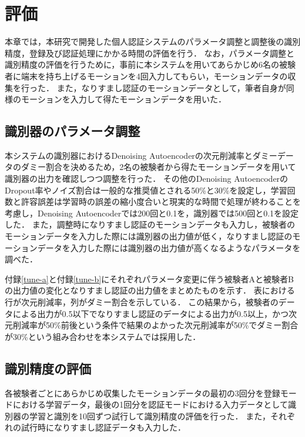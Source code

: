 \chapter{評価}
本章では，本研究で開発した個人認証システムのパラメータ調整と調整後の識別精度，登録及び認証処理にかかる時間の評価を行う．
なお，パラメータ調整と識別精度の評価を行うために，事前に本システムを用いてあらかじめ6名の被験者に端末を持ち上げるモーションを4回入力してもらい，モーションデータの収集を行った．
また，なりすまし認証のモーションデータとして，筆者自身が同様のモーションを入力して得たモーションデータを用いた．

\section{識別器のパラメータ調整}
本システムの識別器におけるDenoising Autoencoderの次元削減率とダミーデータのダミー割合を決めるため，2名の被験者から得たモーションデータを用いて識別器の出力を確認しつつ調整を行った．
その他のDenoising AutoencoderのDropout率やノイズ割合は一般的な推奨値とされる50\%と30\%を設定し，学習回数と許容誤差は学習時の誤差の縮小度合いと現実的な時間で処理が終わることを考慮し，Denoising Autoencoderでは200回と0.1を，識別器では500回と0.1を設定した．
また，調整時になりすまし認証のモーションデータも入力し，被験者のモーションデータを入力した際には識別器の出力値が低く，なりすまし認証のモーションデータを入力した際には識別器の出力値が高くなるようなパラメータを調べた．

付録\ref{tune-a}と付録\ref{tune-b}にそれぞれパラメータ変更に伴う被験者Aと被験者Bの出力値の変化となりすまし認証の出力値をまとめたものを示す．
表における行が次元削減率，列がダミー割合を示している．
この結果から，被験者のデータによる出力が0.5以下でなりすまし認証のデータによる出力が0.5以上，かつ次元削減率が50\%前後という条件で結果のよかった次元削減率が50\%でダミー割合が30\%という組み合わせを本システムでは採用した．


\section{識別精度の評価}
各被験者ごとにあらかじめ収集したモーションデータの最初の3回分を登録モードにおける学習データ，最後の1回分を認証モードにおける入力データとして識別器の学習と識別を10回ずつ試行して識別精度の評価を行った．
また，それぞれの試行時になりすまし認証データも入力した．

